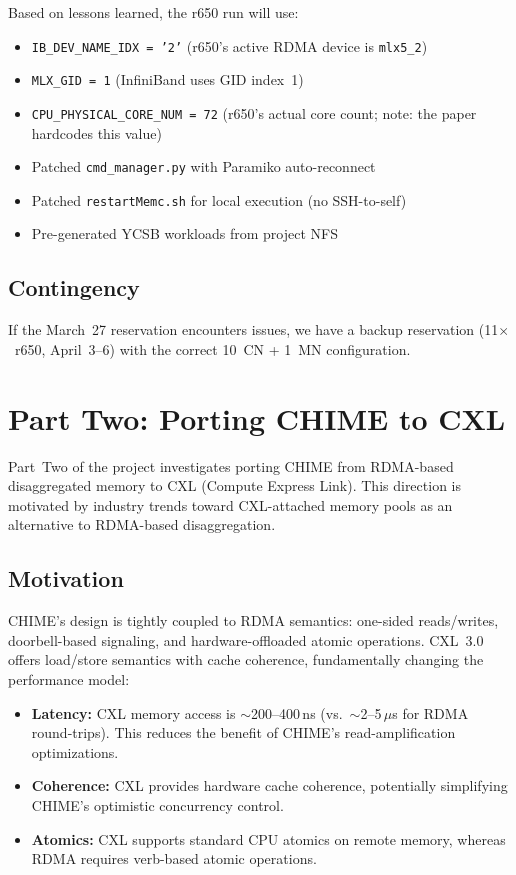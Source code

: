 \documentclass[11pt,a4paper]{article}
\begin{document}
Based on lessons learned, the r650 run will use:
\begin{itemize}[nosep]
    \item \texttt{IB\_DEV\_NAME\_IDX = '2'} (r650's active RDMA device is \texttt{mlx5\_2})
    \item \texttt{MLX\_GID = 1} (InfiniBand uses GID index~1)
    \item \texttt{CPU\_PHYSICAL\_CORE\_NUM = 72} (r650's actual core count; note: the paper hardcodes this value)
    \item Patched \texttt{cmd\_manager.py} with Paramiko auto-reconnect
    \item Patched \texttt{restartMemc.sh} for local execution (no SSH-to-self)
    \item Pre-generated YCSB workloads from project NFS
\end{itemize}

\subsection{Contingency}

If the March~27 reservation encounters issues, we have a backup reservation (11$\times$~r650, April~3--6) with the correct 10~CN + 1~MN configuration.

\section{Part Two: Porting CHIME to CXL}
\label{sec:cxl}

Part~Two of the project investigates porting CHIME from RDMA-based disaggregated memory to CXL (Compute Express Link). This direction is motivated by industry trends toward CXL-attached memory pools as an alternative to RDMA-based disaggregation.

\subsection{Motivation}

CHIME's design is tightly coupled to RDMA semantics: one-sided reads/writes, doorbell-based signaling, and hardware-offloaded atomic operations. CXL~3.0 offers load/store semantics with cache coherence, fundamentally changing the performance model:

\begin{itemize}[nosep]
    \item \textbf{Latency:} CXL memory access is $\sim$200--400\,ns (vs.\ $\sim$2--5\,$\mu$s for RDMA round-trips). This reduces the benefit of CHIME's read-amplification optimizations.
    \item \textbf{Coherence:} CXL provides hardware cache coherence, potentially simplifying CHIME's optimistic concurrency control.
    \item \textbf{Atomics:} CXL supports standard CPU atomics on remote memory, whereas RDMA requires verb-based atomic operations.
\end{itemize}
\end{document}

